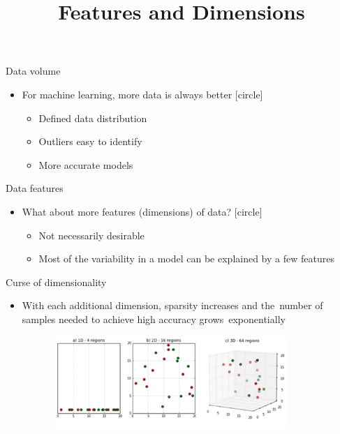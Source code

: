 \documentclass[aspectratio=169,14pt,usenames,dvipsnames]{beamer}
\title[Features and Dimensions]{Features and Dimensions}
\begin{document}
{\1
\begin{frame} \vspace{35pt}
	\maketitle
\end{frame}
}

\begin{frame}{Data volume}
\begin{itemize}
  \item For machine learning, more data is always better \break
{}[circle]
\begin{itemize}
\itemsep1em 
\item Defined data distribution 
\item Outliers easy to identify 
\item More accurate models
\end{itemize}
\end{itemize}
\end{frame}

\begin{frame}{Data features}
\begin{itemize}
\item What about more features (dimensions) of data? \break
{}[circle]
\begin{itemize}
\itemsep1em 
\item Not necessarily desirable
\item Most of the variability in a model can be explained by a few features
\end{itemize}
\end{itemize}
\end{frame}

\begin{frame}{Curse of dimensionality}
\begin{itemize}
\item With each additional dimension, sparsity increases and the number of samples needed to achieve high accuracy grows exponentially\\
\end{itemize}
\centering
\includegraphics[width=12.5cm , height=3.5cm]{Images/AIML_FD_IMG1.png}
\end{frame}
\end{document}
